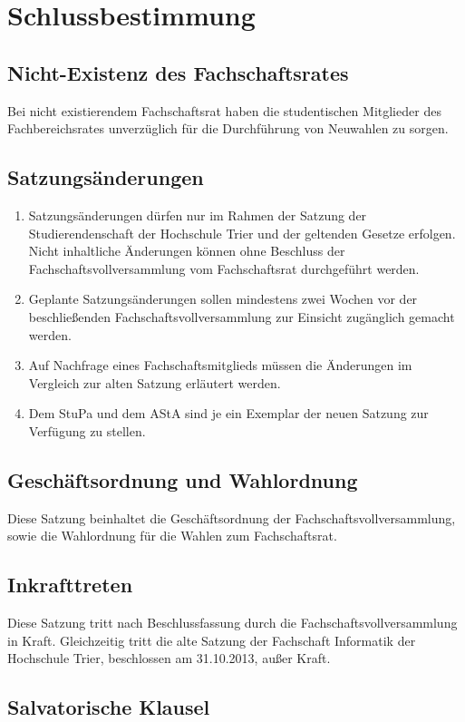 \section{Schlussbestimmung}
\subsection{Nicht-Existenz des Fachschaftsrates}
Bei nicht existierendem Fachschaftsrat haben die studentischen Mitglieder des Fachbereichsrates unverzüglich für die Durchführung von Neuwahlen zu sorgen.

\subsection{Satzungsänderungen}
\begin{enumerate}
\item Satzungsänderungen dürfen nur im Rahmen der Satzung der Studierendenschaft der Hochschule Trier und der geltenden Gesetze erfolgen. Nicht inhaltliche Änderungen können ohne Beschluss der Fachschaftsvollversammlung vom Fachschaftsrat durchgeführt werden.
\item Geplante Satzungsänderungen sollen mindestens zwei Wochen vor der beschließenden Fachschaftsvollversammlung zur Einsicht zugänglich gemacht werden.
\item Auf Nachfrage eines Fachschaftsmitglieds müssen die Änderungen im Vergleich zur alten Satzung erläutert werden.
\item Dem StuPa und dem AStA sind je ein Exemplar der neuen Satzung zur Verfügung zu stellen.
\end{enumerate}

\subsection{Geschäftsordnung und Wahlordnung}
Diese Satzung beinhaltet die Geschäftsordnung der Fachschaftsvollversammlung, sowie die Wahlordnung für die Wahlen zum Fachschaftsrat.

\subsection{Inkrafttreten}
Diese Satzung tritt nach Beschlussfassung durch die Fachschaftsvollversammlung in Kraft. Gleichzeitig tritt die alte Satzung der Fachschaft Informatik der Hochschule Trier, beschlossen am 31.10.2013, außer Kraft.

\subsection{Salvatorische Klausel}
